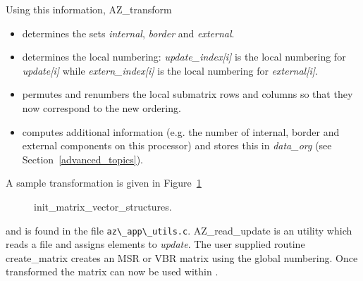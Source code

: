 Using this information, {\sf AZ\_transform}
\begin{itemize}
\item determines the sets {\it internal}, {\it border} and
      {\it external}.
\item determines the local numbering:
      {\it update\_index[i]} is the local numbering for
      {\it update[i]} while {\it extern\_index[i]} is the local
      numbering for {\it external[i]}.
\item permutes and renumbers the local submatrix rows and columns so that
      they now correspond to the new ordering.
\item computes additional information
      (e.g. the number of internal, border and external components on this
      processor) and
      stores this in {\it data\_org\/} (see Section~\ref{advanced_topics}).
\end{itemize}
A sample transformation is given in Figure~\ref{init_mv_structs}
%
\begin{figure}[Htbp]
  \caption{{\sf init\_matrix\_vector\_structures}.}\label{init_mv_structs}
\end{figure}
%
and is found in the file \verb'az\_app\_utils.c'.  {\sf AZ\_read\_update} is an
\Az{} utility which reads a file and assigns elements to {\it update\/}.  The
user supplied routine {\sf create\_matrix} creates an MSR or VBR matrix using
the global numbering.  Once transformed the matrix can now be used within
\Az{}.

